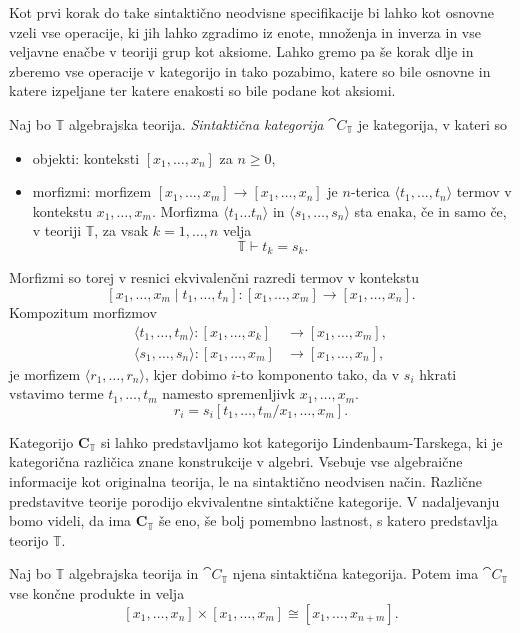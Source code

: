 \documentclass[../kategoricna_logika.tex]{subfiles}
\begin{document}
Kot prvi korak do take sintaktično neodvisne specifikacije
bi lahko kot osnovne vzeli vse operacije, ki jih lahko zgradimo iz
enote, množenja in inverza in vse
veljavne enačbe v teoriji grup kot aksiome. Lahko gremo pa še korak dlje
in zberemo vse operacije v kategorijo in tako pozabimo, katere so bile
osnovne in katere izpeljane ter katere enakosti so bile podane kot aksiomi.
%
\begin{definicija}
  Naj bo $\mathbb{T}$ algebrajska teorija.
  \emph{Sintaktična kategorija} $\cat{C}_\mathbb{T}$ je kategorija,
  v kateri so
  \begin{itemize}
  \item objekti: konteksti $[x_1, \ldots, x_n]$ za $n \geq 0$,
%
  \item morfizmi: morfizem $[x_1, \ldots, x_m] \to [x_1, \ldots, x_n]$
    je $n$-terica $\langle t_1, \ldots, t_n \rangle$ termov v kontekstu
    $x_1, \ldots, x_m$. Morfizma $\langle t_1 \ldots t_n \rangle$ in
    $\langle s_1, \ldots, s_n \rangle$ sta enaka, če in samo če,
    v teoriji $\mathbb{T}$, za vsak $k = 1, \ldots, n$ velja
    $$\mathbb{T} \vdash t_k = s_k.$$
\end{itemize}
%
Morfizmi so torej v resnici ekvivalenčni razredi termov v kontekstu
$$[x_1, \ldots, x_m \mid t_1, \ldots, t_n] : [x_1, \ldots, x_m] \to [x_1, \ldots, x_n].$$
%
Kompozitum morfizmov
  \begin{align*}
    \langle t_1, \ldots, t_m \rangle : [x_1, \ldots, x_k] &\to [x_1, \ldots, x_m], \\
    \langle s_1, \ldots, s_n \rangle : [x_1, \ldots, x_m] &\to [x_1, \ldots, x_n],
  \end{align*}
je morfizem $\langle r_1, \ldots, r_n \rangle$, kjer dobimo $i$-to komponento tako,
da v $s_i$ hkrati vstavimo terme $t_1, \ldots, t_m$ namesto
spremenljivk $x_1, \ldots, x_m$.
$$r_i = s_i[t_1, \ldots, t_m / x_1, \ldots, x_m].$$
%
\end{definicija}
Kategorijo $\mathbf{C}_{\mathbb{T}}$ si lahko predstavljamo kot
kategorijo Lindenbaum-Tarskega, ki je kategorična različica znane konstrukcije v algebri.
Vsebuje vse algebraične
informacije kot originalna teorija, le na sintaktično neodvisen način.
Različne predstavitve teorije porodijo ekvivalentne sintaktične
kategorije. V nadaljevanju bomo videli, da ima $\mathbf{C}_{\mathbb{T}}$ še eno,
še bolj pomembno lastnost, s katero predstavlja teorijo $\mathbb{T}$.
%
\begin{lema}
  Naj bo $\mathbb{T}$ algebrajska teorija in $\cat{C}_\mathbb{T}$
  njena sintaktična kategorija. Potem ima $\cat{C}_\mathbb{T}$ vse
  končne produkte in velja
$$[x_1, \ldots, x_n] \times [x_1, \ldots, x_m] \cong [x_1, \ldots, x_{n+m}].$$
\end{lema}
\end{document}
